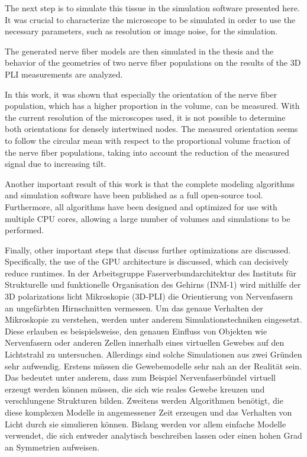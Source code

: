 The next step is to simulate this tissue in the simulation software presented here.
It was crucial to characterize the microscope to be simulated in order to use the necessary parameters, such as resolution or image noise, for the simulation.

The generated nerve fiber models are then simulated in the thesis and the behavior of the geometries of two nerve fiber populations on the results of the 3D PLI measurements are analyzed.

In this work, it was shown that especially the orientation of the nerve fiber population, which has a higher proportion in the volume, can be measured.
With the current resolution of the microscopes used, it is not possible to determine both orientations for densely intertwined nodes.
The measured orientation seems to follow the circular mean with respect to the proportional volume fraction of the nerve fiber populations, taking into account the reduction of the measured signal due to increasing tilt.

Another important result of this work is that the complete modeling algorithms and simulation software have been published as a full open-source tool.
Furthermore, all algorithms have been designed and optimized for use with multiple CPU cores, allowing a large number of volumes and simulations to be performed.

Finally, other important steps that discuss further optimizations are discussed.
Specifically, the use of the GPU architecture is discussed, which can decisively reduce runtimes.
% 
% 
% 
% 
In der Arbeitsgruppe Faserverbundarchitektur des Instituts für Strukturelle und funktionelle Organisation des Gehirns (INM-1) wird mithilfe der 3D polarizations licht Mikroskopie (3D-PLI) die Orientierung von Nervenfasern an ungefärbten Hirnschnitten vermessen.
Um das genaue Verhalten der Mikroskopie zu verstehen, werden unter anderem Simulationstechniken eingesetzt.
Diese erlauben es beispielsweise, den genauen Einfluss von Objekten wie Nervenfasern oder anderen Zellen innerhalb eines virtuellen Gewebes auf den Lichtstrahl zu untersuchen.
Allerdings sind solche Simulationen aus zwei Gründen sehr aufwendig.
Erstens müssen die Gewebemodelle sehr nah an der Realität sein.
Das bedeutet unter anderem, dass zum Beispiel Nervenfaserbündel virtuell erzeugt werden können müssen, die sich wie reales Gewebe kreuzen und verschlungene Strukturen bilden.
Zweitens werden Algorithmen benötigt, die diese komplexen Modelle in angemessener Zeit erzeugen und das Verhalten von Licht durch sie simulieren können.
Bislang werden vor allem einfache Modelle verwendet, die sich entweder analytisch beschreiben lassen oder einen hohen Grad an Symmetrien aufweisen.

